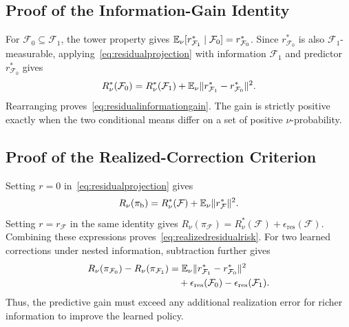 \subsection{Proof of the Information-Gain Identity}
\label{app:residualinformationgain}
For $\mathcal F_0\subseteq\mathcal F_1$, the tower property gives
$\mathbb E_\nu[r_{\mathcal F_1}^*\mid\mathcal F_0]=r_{\mathcal F_0}^*$.
Since $r_{\mathcal F_0}^*$ is also $\mathcal F_1$-measurable, applying~\eqref{eq:residualprojection} with information $\mathcal F_1$ and predictor $r_{\mathcal F_0}^*$ gives
\begin{equation}
 R_\nu^*(\mathcal F_0)
 =R_\nu^*(\mathcal F_1)
  +\mathbb E_\nu\lVert r_{\mathcal F_1}^*-r_{\mathcal F_0}^*\rVert^2.
 \label{eq:appresidualinformationgain}
\end{equation}
Rearranging proves~\eqref{eq:residualinformationgain}.
The gain is strictly positive exactly when the two conditional means differ on a set of positive $\nu$-probability.

\subsection{Proof of the Realized-Correction Criterion}
\label{app:realizedresidual}
Setting $r=0$ in~\eqref{eq:residualprojection} gives
\begin{equation}
 R_\nu(\pi_{\mathrm b})
 =R_\nu^*(\mathcal F)+\mathbb E_\nu\lVert r_{\mathcal F}^*\rVert^2.
 \label{eq:basepredictableerror}
\end{equation}
Setting $r=r_{\mathcal F}$ in the same identity gives
$R_\nu(\pi_{\mathcal F})=R_\nu^*(\mathcal F)+\epsilon_{\mathrm{res}}(\mathcal F)$.
Combining these expressions proves~\eqref{eq:realizedresidualrisk}.
For two learned corrections under nested information, subtraction further gives
\begin{equation}
 \begin{aligned}
 R_\nu(\pi_{\mathcal F_0})-R_\nu(\pi_{\mathcal F_1})
 &=\mathbb E_\nu\lVert r_{\mathcal F_1}^*-r_{\mathcal F_0}^*\rVert^2\\
 &\quad+\epsilon_{\mathrm{res}}(\mathcal F_0)
       -\epsilon_{\mathrm{res}}(\mathcal F_1).
 \end{aligned}
 \label{eq:learnedinformationgain}
\end{equation}
Thus, the predictive gain must exceed any additional realization error for richer information to improve the learned policy.


